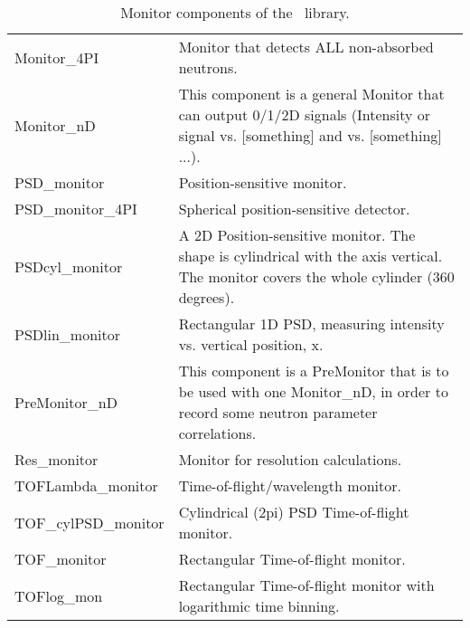 \begin{table}
\begin{center}
{\begin{tabular}{|p{}|p{}|}
Monitor\_4PI     &    Monitor that detects ALL
                    non-absorbed neutrons. \\
Monitor\_nD      &    This
                    component is a general
          Monitor that can output
                    0/1/2D signals (Intensity
                    or signal vs. [something]
                    and vs. [something] ...). \\
PSD\_monitor     &    Position-sensitive
                    monitor. \\
PSD\_monitor\_4PI  &   Spherical
                    position-sensitive
                    detector. \\
PSDcyl\_monitor  &    A 2D
                    Position-sensitive
                    monitor. The shape is
                    cylindrical with the axis
                    vertical. The monitor
                    covers the whole cylinder
                    (360 degrees). \\
PSDlin\_monitor   &   Rectangular 1D PSD,
                    measuring intensity vs.
                    vertical position, x. \\
PreMonitor\_nD    &   This component is a
                    PreMonitor that is to be
                    used with one Monitor\_nD,
                    in order to record some
                    neutron parameter correlations. \\
Res\_monitor      &   Monitor for resolution
                    calculations. \\
TOFLambda\_monitor &  Time-of-flight/wavelength
                    monitor. \\
TOF\_cylPSD\_monitor & Cylindrical (2pi) PSD
                    Time-of-flight monitor. \\
TOF\_monitor     &    Rectangular Time-of-flight
                    monitor. \\
TOFlog\_mon      &    Rectangular Time-of-flight
                    monitor with logarithmic
                    time binning. \\
      \hline
    \end{tabular}
    \caption{Monitor components of the \MCS\ library.}
    \label{t:comp-monitors}
    }
  \end{center}
\end{table}

